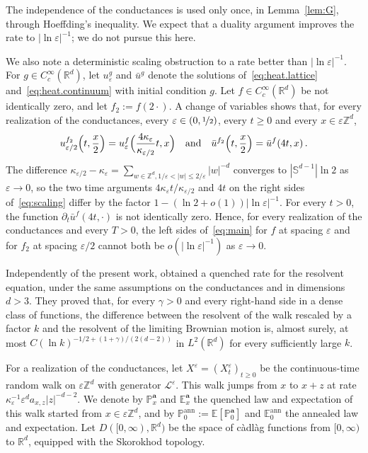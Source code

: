 \documentclass[11pt]{amsart}
\numberwithin{equation}{section}
\newcommand{\Z}{\mathbb{Z}}
\newcommand{\R}{\mathbb{R}}
\newcommand{\E}{\mathbb{E}}
\newcommand{\PP}{\mathbb{P}}
\newcommand{\ba}{\mathbf{a}}
\newcommand{\eps}{\varepsilon}
\newcommand{\Leps}{\mathcal{L}^\varepsilon}
\newcommand{\nf}{\nicefrac}
\begin{document}
The independence of the conductances is used only once, in Lemma~\ref{lem:G}, through Hoeffding's inequality.
We expect that a duality argument improves the rate to $|\ln \eps|^{-1}$; we do not pursue this here.

We also note a deterministic scaling obstruction to a rate better than $|\ln \eps|^{-1}$.
For $g \in C^\infty_c(\R^d)$, let $u^g_\eps$ and $\bar u^g$ denote the solutions of~\eqref{eq:heat.lattice} and~\eqref{eq:heat.continuum} with initial condition $g$.
Let $f \in C^\infty_c(\R^d)$ be not identically zero, and let $f_2 := f(2 \cdot)$.
A change of variables shows that, for every realization of the conductances, every $\eps \in (0, \nf12)$, every $t \geq 0$ and every $x \in \eps \Z^d$,
\begin{equation} \label{eq:scaling}
    u^{f_2}_{\eps/2} \Bigl( t, \frac{x}{2} \Bigr) = u^f_\eps \Bigl( \frac{4 \kappa_\eps}{\kappa_{\eps/2}} t, x \Bigr)
    \quad \text{and} \quad
    \bar u^{f_2} \Bigl( t, \frac{x}{2} \Bigr) = \bar u^f (4t, x)\,.
\end{equation}
The difference $\kappa_{\eps/2} - \kappa_\eps = \sum_{w \in \Z^d, 1/\eps < |w| \leq 2/\eps} |w|^{-d}$ converges to $|\mathbb{S}^{d-1}| \ln 2$ as $\eps \to 0$, so the two time arguments $4 \kappa_\eps t / \kappa_{\eps/2}$ and $4t$ on the right sides of~\eqref{eq:scaling} differ by the factor $1 - (\ln 2 + o(1)) |\ln \eps|^{-1}$.
For every $t > 0$, the function $\partial_t \bar u^f(4t, \cdot)$ is not identically zero.
Hence, for every realization of the conductances and every $T > 0$, the left sides of~\eqref{eq:main} for $f$ at spacing $\eps$ and for $f_2$ at spacing $\eps/2$ cannot both be $o(|\ln \eps|^{-1})$ as $\eps \to 0$.

Independently of the present work, \citet*[Theorem~1.1]{CGW2026} obtained a quenched rate for the resolvent equation, under the same assumptions on the conductances and in dimensions $d > 3$.
They proved that, for every $\gamma > 0$ and every right-hand side in a dense class of functions, the difference between the resolvent of the walk rescaled by a factor $k$ and the resolvent of the limiting Brownian motion is, almost surely, at most $C (\ln k)^{-1/2 + (1+\gamma)/(2(d-2))}$ in $L^2(\R^d)$ for every sufficiently large $k$.

For a realization of the conductances, let $X^\eps = (X^\eps_t)_{t \geq 0}$ be the continuous-time random walk on $\eps \Z^d$ with generator $\Leps$.
This walk jumps from $x$ to $x + z$ at rate $\kappa_\eps^{-1} \eps^d a_{x,z} |z|^{-d-2}$.
We denote by $\PP^\ba_x$ and $\E^\ba_x$ the quenched law and expectation of this walk started from $x \in \eps \Z^d$, and by $\PP^{\mathrm{ann}}_0 := \E[\PP^\ba_0]$ and $\E^{\mathrm{ann}}_0$ the annealed law and expectation.
Let $D([0, \infty), \R^d)$ be the space of c\`adl\`ag functions from $[0,\infty)$ to $\R^d$, equipped with the Skorokhod topology.
\end{document}
